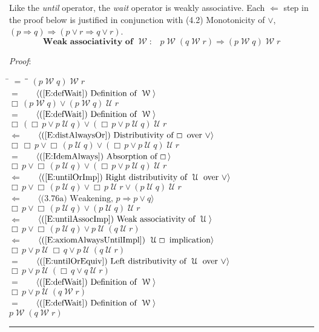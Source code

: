 \documentclass[12pt, fleqn, leqno]{article}
\newcommand{\lgap}{2pt}                             %
\newcommand{\mymathindent}{24pt}                    %
\newcommand{\impl}{\ensuremath{\Rightarrow}}        %
\newcommand{\foll}{\ensuremath{\Leftarrow}}         %
\newcommand{\Until}{\;\mathcal{U}\;}
\newcommand{\Wait}{\;\mathcal{W}\;}
\newcommand{\Always}{\Box\,}
\newcommand{\myqed}{\rule[-.23ex]{1.2ex}{2.0ex}}
\newcommand{\myqedtab}{\hspace{384pt}}              %
\newcommand{\Gll} {\langle}                         %
\newcommand{\Ggg} {\rangle}                         %
\newcommand{\Hint}[1]     {\ \ \ $\Gll              \mbox{#1} \Ggg$ }   %
\begin{document}
Like the \textit{until} operator, the \textit{wait} operator is weakly associative.
Each $\foll$ step in the proof below is justified in conjunction with (4.2) Monotonicity of $\lor$, $(p\impl q)\impl (p\lor r \impl q\lor r)$.
\begin{equation}\label{E:waitAssocImp}
\textbf{Weak associativity of $\Wait$:}\quad p \Wait (q \Wait r) \impl (p \Wait q) \Wait r
\end{equation}

\emph{Proof}:
\begin{tabbing}
\hspace{\mymathindent} \= $= \;$ \= \myqedtab \= \kill
\> \> $(p \Wait q) \Wait r$\\[\lgap]
\> $=$ \> \Hint{(\ref{E:defWait}) Definition of $\Wait$} \\[\lgap]
\> \> $\Always (p \Wait q) \lor (p\Wait q)\Until r$\\[\lgap]
\> $=$ \> \Hint{(\ref{E:defWait}) Definition of $\Wait$} \\[\lgap]
\> \> $\Always (\Always p\lor p\Until q) \lor (\Always p\lor p\Until q)\Until r$\\[\lgap]
\> $\foll$  \>  \Hint{(\ref{E:distAlwaysOr}) Distributivity of $\Always$ over $\lor$}\\[\lgap]
\> \> $\Always\Always p\lor \Always (p\Until q) \lor (\Always p\lor p\Until q)\Until r$\\[\lgap]
\> $=$  \>  \Hint{(\ref{E:IdemAlways}) Absorption of $\Always$}\\[\lgap]
\> \> $\Always p\lor \Always (p\Until q) \lor (\Always p\lor p\Until q)\Until r$\\[\lgap]
\> $\foll$ \> \Hint{(\ref{E:untilOrImp}) Right distributivity of $\Until$ over $\lor$} \\[\lgap]
\> \> $\Always p\lor \Always (p\Until q) \lor \Always p\Until r\lor (p\Until q)\Until r$\\[\lgap]
\> $\foll$ \> \Hint{(3.76a) Weakening, $p\impl p\lor q$} \\[\lgap]
\> \> $\Always p\lor \Always (p\Until q) \lor (p\Until q)\Until r$\\[\lgap]
\> $\foll$ \>  \Hint{(\ref{E:untilAssocImp}) Weak associativity of $\Until$}\\[\lgap]
\> \> $\Always p\lor \Always (p\Until q) \lor p\Until (q\Until r)$\\[\lgap]
\> $\foll$ \> \Hint{(\ref{E:axiomAlwaysUntilImpl}) $\Until\Always$ implication}\\[\lgap]
\> \> $\Always p\lor p\Until \Always q \lor p\Until (q\Until r)$\\[\lgap]
\> $=$ \> \Hint{(\ref{E:untilOrEquiv}) Left distributivity of $\Until$ over $\lor$}\\[\lgap]
\> \> $\Always p\lor p\Until (\Always q \lor q\Until r)$\\[\lgap]
\> $=$ \> \Hint{(\ref{E:defWait}) Definition of $\Wait$} \\[\lgap]
\> \> $\Always p\lor p\Until (q\Wait r)$\\[\lgap]
\> $=$ \> \Hint{(\ref{E:defWait}) Definition of $\Wait$} \\[\lgap]
\> \> $p \Wait (q \Wait r)$ \quad \myqed
\end{tabbing}
\end{document}
